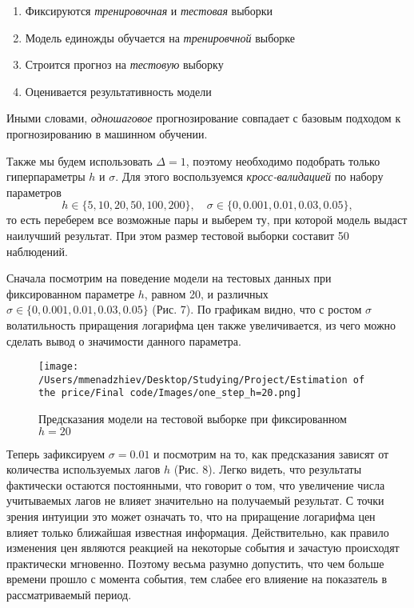 \begin{enumerate}
\item Фиксируются \textit{тренировочная} и \textit{тестовая} выборки

\item Модель единожды обучается на \textit{тренировчной} выборке

\item Строится прогноз на \textit{тестовую} выборку

\item Оценивается результативность модели
\end{enumerate}

\vspace{-15pt}

Иными словами, \textit{одношаговое} прогнозирование совпадает с базовым подходом к прогнозированию в машинном обучении.

Также мы будем использовать $\Delta = 1$, поэтому необходимо подобрать только гиперпараметры $h$ и $\sigma$. Для этого воспользуемся \textit{кросс-валидацией} по набору параметров
\[
h \in \{ 5, 10, 20, 50, 100, 200 \}, \quad \sigma \in \{ 0, 0.001, 0.01, 0.03, 0.05 \},
\]
то есть переберем все возможные пары и выберем ту, при которой модель выдаст наилучший результат. При этом размер тестовой выборки составит 50 наблюдений.

Сначала посмотрим на поведение модели на тестовых данных при фиксированном параметре $h$, равном 20, и различных $\sigma \in \{ 0, 0.001, 0.01, 0.03, 0.05 \}$  (Рис. 7). По графикам видно, что с ростом $\sigma$ волатильность приращения логарифма цен также увеличивается, из чего можно сделать вывод о значимости данного параметра.

\begin{figure}[H]
    \centering
    \texttt{[image: /Users/mmenadzhiev/Desktop/Studying/Project/Estimation of the price/Final code/Images/one\_step\_h=20.png]}
    \caption{Предсказания модели на тестовой выборке при фиксированном $h = 20$}
\end{figure}

Теперь зафиксируем $\sigma = 0.01$ и посмотрим на то, как предсказания зависят от количества используемых лагов $h$ (Рис. 8). Легко видеть, что результаты фактически остаются постоянными, что говорит о том, что увеличение числа учитываемых лагов не влияет значительно на получаемый результат. С точки зрения интуиции это может означать то, что на приращение логарифма цен влияет только ближайшая известная информация. Действительно, как правило изменения цен являются реакцией на некоторые события и зачастую происходят практически мгновенно. Поэтому весьма разумно допустить, что чем больше времени прошло с момента события, тем слабее его влияение на показатель в рассматриваемый период.

